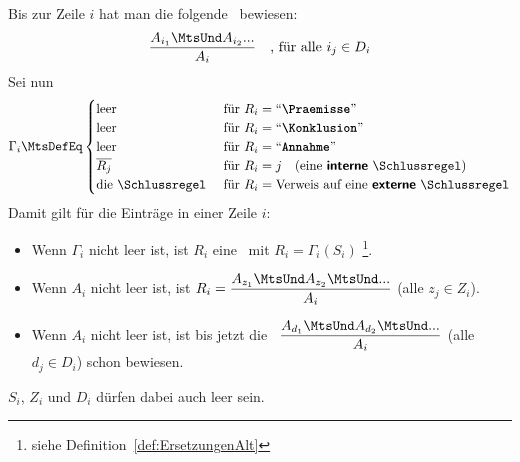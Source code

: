 {Bis zur Zeile $i$ hat man die folgende \Schlussregel\ bewiesen:
\[ \frac{A_{i_1} \MtsUnd A_{i_2} ...}{A_i} \quad \text{, für alle } i_j \in D_i \]
Sei nun
\[
	\Gamma_i \MtsDefEq
	\begin{cases}
		\text{leer}    & \text{ für } R_i = \text{\strqt{\Praemisse}} \\
		\text{leer}    & \text{ für } R_i = \text{\strqt{\Konklusion}}     \\
		\text{leer}    & \text{ für } R_i = \text{\strqt{Annahme}}        \\
		\overline{R_j} & \text{ für } R_i = j \quad \text{(eine \defFt{interne} \Schlussregel)} \\
		\text{die \Schlussregel} & \text{ für } R_i = \text{Verweis auf eine \defFt{externe} \Schlussregel}
	\end{cases}
\]
Damit gilt für die Einträge in einer Zeile $i$:
\begin{itemize}
	\item Wenn $\Gamma_i$ nicht leer ist, ist $R_i$ eine \Schlussregel\ mit $R_i = \Gamma_i(S_i)$%
	\footnote{%
		siehe Definition~\eqref{def:ErsetzungenAlt} 
	}.
	\item Wenn $A_i$ nicht leer ist, ist $R_i = \dfrac{A_{z_1} \MtsUnd A_{z_2} \MtsUnd ...}{A_i}$ (alle $z_j \in Z_i$).
	\item Wenn $A_i$ nicht leer ist, ist bis jetzt die \Schlussregel\ $\dfrac{A_{d_1} \MtsUnd A_{d_2} \MtsUnd ...}{A_i}$ (alle $d_j \in D_i$) schon bewiesen.
\end{itemize}
$S_i$, $Z_i$ und $D_i$ dürfen dabei auch leer sein.

}
